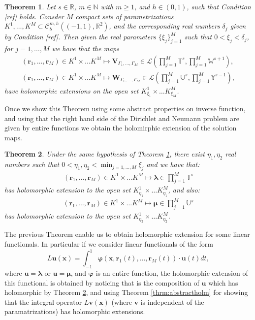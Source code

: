 \documentclass{article}
\newtheorem{theorem}{Theorem}[section]
\newcommand{\todo}[1]{{\color{red}[#1]}}
\newcommand{\bmu} {\bm{\mu}}
\newcommand{\IN}{{\mathbb N}}
\newcommand{\IR}{{\mathbb R}}
\newcommand{\IU}{{\mathbb U}}
\newcommand{\IT}{{\mathbb T}}
\newcommand{\IW}{{\mathbb W}}
\newcommand{\IY}{{\mathbb Y}}
\newcommand{\rgeoh}[2]{\mathcal{C}_b^{#1,#2}\left( (-1,1), \IR^2 \right)}
\newcommand{\bla}{\boldsymbol \lambda}
\newcommand{\bu}{\bm{u}}
\newcommand{\bv}{\bm{v}}
\newcommand{\br}{\bm{r}}
\newcommand{\bx}{\bm{x}}
\begin{document}
\begin{theorem}
\label{thrm:biohlmextension}
Let $s \in \IR$, $m \in \IN$ with $m \geq 1$, and $h \in (0,1)$, such that Condition \todo{ref} holds. Consder $M$ compact sets of parametrizations $K^1,\hdots,K^M \subset \rgeoh{m}{h}$, and the corresponding real numbers $\delta_j$ given by Condition  \todo{ref}. Then given the real parameters $\{\xi_j\}_{j=1}^M$ such that $0 < \xi_j < \delta_j$, for $j=1,\hdots,M$ we have that the maps 
\begin{align*}
(\br_1,\hdots,\br_M) \in K^1 \times \hdots K^M \mapsto \mathbf{V}_{\Gamma_1, \hdots,\Gamma_M} \in \mathcal{L} \left(  \prod_{j=1}^M \IT^s, \prod_{j=1}^M \IW^{s+1}
\right)
,\\
(\br_1,\hdots,\br_M) \in K^1 \times \hdots K^M \mapsto \mathbf{W}_{\Gamma_1, \hdots,\Gamma_M} \in \mathcal{L} \left(  \prod_{j=1}^M \IU^s, \prod_{j=1}^M \IY^{s-1}
\right)
,
\end{align*}
have holomorphic extensions on the open set $K^1_{\xi_1}\times\hdots K^M_{\xi_M}$.
\end{theorem}
Once we show this Theorem using some abstract properties on inverse function, and using that the right hand side of the Dirichlet and Neumann problem are given by entire functions we obtain the holomirphic extension of the solution maps. 
\begin{theorem}
\label{thrm:solutionholomrext}
Under the same hypothesis of Theorem \ref{thrm:biohlmextension}, there exist $\eta_1,\eta_2$ real numbers such that
$0<\eta_1,\eta_2< \min_{j=1,\hdots,M}\xi_j$ and we have that: 
\begin{align*}
(\br_1,\hdots,\br_M) \in K^1 \times \hdots K^M \mapsto  \bla \in \prod_{j=1}^M \IT^s
\end{align*}
has holomorphic extension to the open set $K_{\eta_1}^1 \times \hdots K_{\eta_1}^M$, and also: 
\begin{align*}
(\br_1,\hdots,\br_M) \in K^1 \times \hdots K^M \mapsto  \bmu \in \prod_{j=1}^M \IU^s
\end{align*}
has holomorphic extension to the open set $K_{\eta_2}^1 \times \hdots K_{\eta_2}^M$.
\end{theorem}
The previous Theorem enable us to obtain holomorphic extension for some linear functionals. In particular if we consider linear functionals of the form  $$L\bu (\bx) = \int_{-1}^{1} \mathbf{\varphi}(\bx,\br_1(t),\hdots,\br_M(t)) \cdot \bu(t) dt,$$ where $\bu = \bla $ or $\bu = \bmu$, and $\mathbf{\varphi}$ is an entire function, the holomorphic extension of this functional is obtained by noticing that is the composition of $\bu$ which has holomorphic by Theorem \ref{thrm:solutionholomrext}, and using Theorem \ref{thrm:abstractholm} for showing that the integral operator 
$L\bv(\bx)$ (where $\bv$ is independent of the paramatrizations) has holomorphic extensions. 
\end{document}
